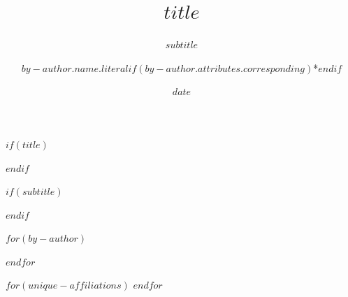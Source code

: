 $if(title)$
\title{$title$}
$endif$

$if(subtitle)$
\subtitle{$subtitle$}
$endif$

$for(by-author)$
  \author[$for(by-author.affiliations)$$index$$sep$, $endfor$]{$by-author.name.literal$$if(by-author.attributes.corresponding)$*$endif$}
$endfor$

$for(unique-affiliations)$
$endfor$

\date{$date$}
